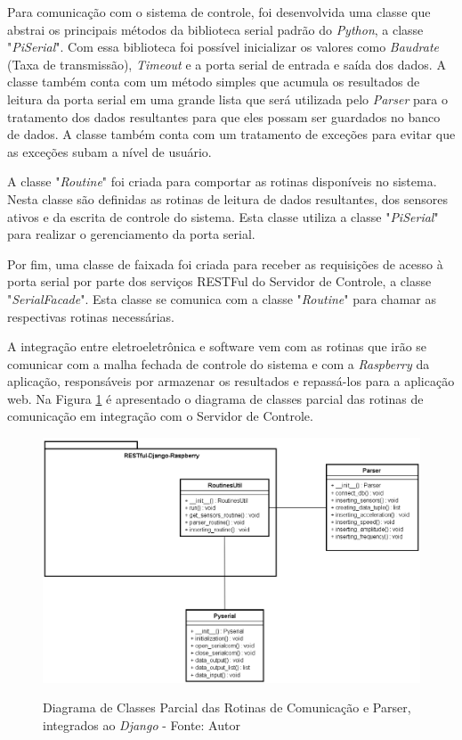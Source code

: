 Para comunicação com o sistema de controle, foi desenvolvida uma classe que abstrai os principais métodos da 
biblioteca serial padrão do \textit{Python}, a classe "\textit{PiSerial}".
Com essa biblioteca foi possível inicializar os valores como \textit{Baudrate} (Taxa de transmissão),
\textit{Timeout} e a porta serial de entrada e saída dos dados. A classe também conta com um método simples
que acumula os resultados de leitura da porta serial em uma grande lista que será utilizada pelo \textit{Parser}
para o tratamento dos dados resultantes para que eles possam ser guardados no banco de 
dados. A classe também conta com um tratamento de exceções para evitar que as exceções subam a nível de usuário.

A classe "\textit{Routine}" foi criada para comportar as rotinas disponíveis no sistema.
Nesta classe são definidas as rotinas de leitura de dados resultantes, dos sensores ativos e da escrita de controle do sistema.
Esta classe utiliza a classe  "\textit{PiSerial}" para realizar o gerenciamento da porta serial.

Por fim, uma classe de faixada foi criada para receber as requisições de acesso à porta serial por parte dos serviços RESTFul
do Servidor de Controle, a classe "\textit{SerialFacade}". Esta classe se comunica com a classe "\textit{Routine}" para chamar as 
respectivas rotinas necessárias.

A integração entre eletroeletrônica e software vem com as rotinas que irão se comunicar com a malha fechada de controle do sistema e com a 
\textit{Raspberry} da aplicação, responsáveis por armazenar os resultados e repassá-los para a aplicação web.
Na Figura \ref{fig:uml_routines_parser} é apresentado o diagrama de classes parcial das rotinas de comunicação em integração
com o Servidor de Controle.

\begin{figure}[H]
\centering
\includegraphics[keepaspectratio=true,scale=0.65]{figuras/uml_routines_parser.png}
\label{fig:uml_routines_parser}
\caption{Diagrama de Classes Parcial das Rotinas de Comunicação e Parser, integrados ao \textit{Django} - Fonte: Autor}
\end{figure}


